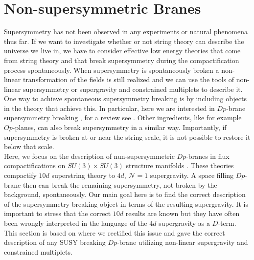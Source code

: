 \documentclass[12pt]{report}
\begin{document}
\section{Non-supersymmetric Branes}
Supersymmetry has not been observed in any experiments or natural phenomena thus far. If we want to investigate whether or not string theory can describe the universe we live in, we have to consider effective low energy theories that come from string theory and that break supersymmetry during the compactification process spontaneously. When supersymmetry is spontaneously broken a non-linear transformation of the fields is still realized and we can use the tools of non-linear supersymmetry or supergravity and constrained multiplets to describe it. One way to achieve spontaneous supersymmetry breaking is by including objects in the theory that achieve this. In particular, here we are interested in $Dp$-brane supersymmetry breaking \cite{Sugimoto:1999tx,Antoniadis:1999xk,Angelantonj:1999jh,Aldazabal:1999jr,Angelantonj:1999ms,Dudas:2000nv,Pradisi:2001yv}, for a review see \cite{Mourad:2017rrl}. Other ingredients, like for example $Op$-planes, can also break supersymmetry in a similar way. Importantly, if supersymmetry is broken at or near the string scale, it is not possible to restore it below that scale.\\
Here, we focus on the description of nun-supersymmetric $Dp$-branes in flux compactifications on $SU(3)\times SU(3)$ structure manifolds \cite{Lust:2008zd}. These theories compactify $10d$ superstring theory to $4d$, $\mathcal{N}=1$ supergravity. A space filling $Dp$-brane then can break the remaining supersymmetry, not broken by the background, spontaneously. Our main goal here is to find the correct description of the supersymmetry breaking object in terms of the resulting supergravity. It is important to stress that the correct $10d$ results are known \cite{Villadoro:2006ia,Blumenhagen:2002wn,Kachru:1999vj,Cvetic:2001nr} but they have often been wrongly interpreted in the language of the $4d$ supergravity as a $D$-term. This section is based on \cite{Cribiori:2020bgt} where we rectified this issue and gave the correct description of any SUSY breaking $Dp$-brane utilizing non-linear supergravity and constrained multiplets.
\end{document}
